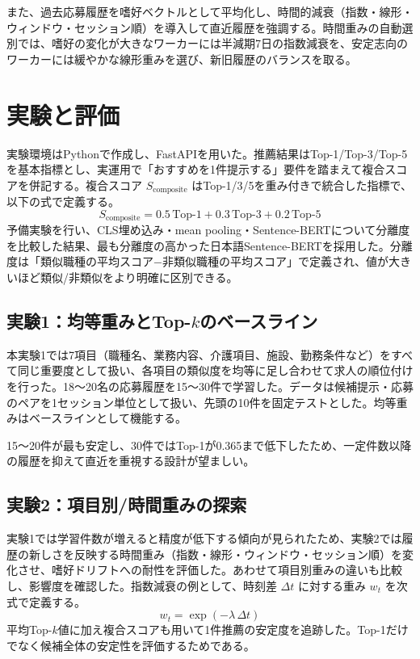 \documentclass[twocolumn,a4j,dvipdfmx]{jsarticle_customized1}
\begin{document}
また、過去応募履歴を嗜好ベクトルとして平均化し、時間的減衰（指数・線形・ウィンドウ・セッション順）を導入して直近履歴を強調する。時間重みの自動選別では、嗜好の変化が大きなワーカーには半減期7日の指数減衰を、安定志向のワーカーには緩やかな線形重みを選び、新旧履歴のバランスを取る。

\section{実験と評価}
実験環境はPythonで作成し、FastAPIを用いた\cite{fastapi}。推薦結果はTop-1/Top-3/Top-5を基本指標とし、実運用で「おすすめを1件提示する」要件を踏まえて複合スコアを併記する。複合スコア $S_{\text{composite}}$ はTop-1/3/5を重み付きで統合した指標で、以下の式で定義する。
\[
S_{\text{composite}}=0.5\,\text{Top-1}+0.3\,\text{Top-3}+0.2\,\text{Top-5}
\]
予備実験を行い、CLS埋め込み・mean pooling・Sentence-BERTについて分離度を比較した結果、最も分離度の高かった日本語Sentence-BERTを採用した。分離度は「類似職種の平均スコア−非類似職種の平均スコア」で定義され、値が大きいほど類似/非類似をより明確に区別できる。

 \subsection{実験1：均等重みとTop-$k$のベースライン}
本実験1では7項目（職種名、業務内容、介護項目、施設、勤務条件など）をすべて同じ重要度として扱い、各項目の類似度を均等に足し合わせて求人の順位付けを行った。18〜20名の応募履歴を15〜30件で学習した。データは候補提示・応募のペアを1セッション単位として扱い、先頭の10件を固定テストとした。均等重みはベースラインとして機能する。
 \begin{table}[H]
 \caption{実験1：学習件数別Top-$k$精度}
 \label{tab:exp1-topk}
 \centering
 \end{table}
15〜20件が最も安定し、30件ではTop-1が0.365まで低下したため、一定件数以降の履歴を抑えて直近を重視する設計が望ましい。

 \subsection{実験2：項目別/時間重みの探索}
実験1では学習件数が増えると精度が低下する傾向が見られたため、実験2では履歴の新しさを反映する時間重み（指数・線形・ウィンドウ・セッション順）を変化させ、嗜好ドリフトへの耐性を評価した。あわせて項目別重みの違いも比較し、影響度を確認した。指数減衰の例として、時刻差 $\Delta t$ に対する重み $w_t$ を次式で定義する。\[
w_t=\exp(-\lambda\, \Delta t)
\]
平均Top-$k$値に加え複合スコアも用いて1件推薦の安定度を追跡した。Top-1だけでなく候補全体の安定性を評価するためである。
\end{document}
